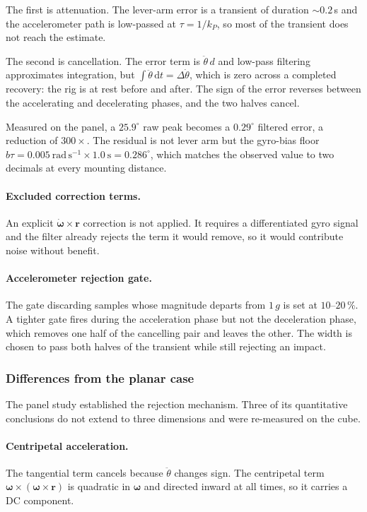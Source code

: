 The first is attenuation. The lever-arm error is a transient of duration
${\sim}0.2$\,s and the accelerometer path is low-passed at $\tau = 1/k_P$, so
most of the transient does not reach the estimate.

The second is cancellation. The error term is $\ddot\theta\,d$ and
low-pass filtering approximates integration, but
$\int\ddot\theta\,\mathrm{d}t = \Delta\dot\theta$, which is zero across a
completed recovery: the rig is at rest before and after. The sign of the
error reverses between the accelerating and decelerating phases, and the two
halves cancel.

Measured on the panel, a $25.9^\circ$ raw peak becomes a $0.29^\circ$
filtered error, a reduction of $300\times$. The residual is not lever arm but
the gyro-bias floor $b\tau = 0.005\ \mathrm{rad\,s^{-1}} \times 1.0\
\mathrm{s} = 0.286^\circ$, which matches the observed value to two decimals
at every mounting distance.

\paragraph{Excluded correction terms.} An explicit
$\dot{\bm{\omega}}\times\bm{r}$ correction is not applied. It requires a
differentiated gyro signal and the filter already rejects the term it would
remove, so it would contribute noise without benefit.

\paragraph{Accelerometer rejection gate.} The gate discarding samples whose
magnitude departs from $1\,g$ is set at $10$--$20\,\%$. A tighter gate fires
during the acceleration phase but not the deceleration phase, which removes
one half of the cancelling pair and leaves the other. The width is chosen to
pass both halves of the transient while still rejecting an impact.

\subsubsection{Differences from the planar case}
\label{sec:1d-to-3d}

The panel study established the rejection mechanism. Three of its
quantitative conclusions do not extend to three dimensions and were
re-measured on the cube.

\paragraph{Centripetal acceleration.} The tangential term cancels because
$\ddot\theta$ changes sign. The centripetal term
$\bm{\omega}\times(\bm{\omega}\times\bm{r})$ is quadratic in $\bm{\omega}$
and directed inward at all times, so it carries a DC component.

